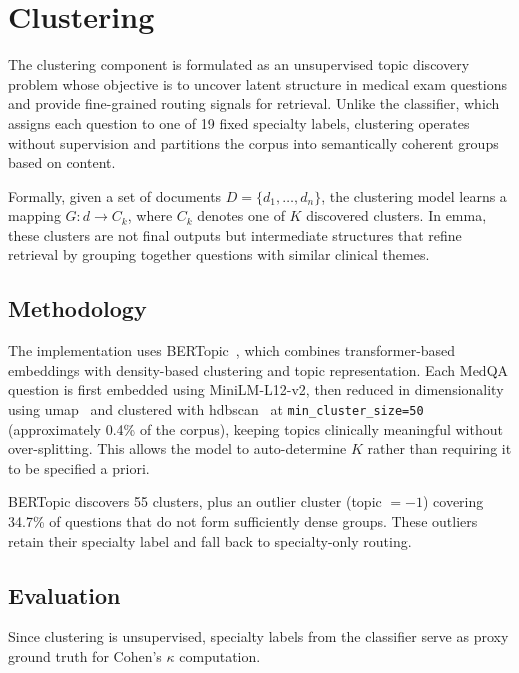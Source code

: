 \section{Clustering}
\label{sec:clustering}

The clustering component is formulated as an unsupervised topic discovery problem whose objective is to uncover latent structure in medical exam questions and provide fine-grained routing signals for retrieval. Unlike the classifier, which assigns each question to one of 19 fixed specialty labels, clustering operates without supervision and partitions the corpus into semantically coherent groups based on content.

Formally, given a set of documents $D = \{d_1,\ldots,d_n\}$, the clustering model learns a mapping $G: d \rightarrow C_k$, where $C_k$ denotes one of $K$ discovered clusters. In \gls{emma}, these clusters are not final outputs but intermediate structures that refine retrieval by grouping together questions with similar clinical themes.

\subsection{Methodology}

The implementation uses BERTopic~\cite{grootendorst_bertopic_2022}, which combines transformer-based embeddings with density-based clustering and topic representation. Each MedQA question is first embedded using MiniLM-L12-v2, then reduced in dimensionality using \gls{umap}~\cite{mcinnes_umap_2020} and clustered with \gls{hdbscan}~\cite{campello_densitybased_2013} at \texttt{min\_cluster\_size=50} (approximately 0.4\% of the corpus), keeping topics clinically meaningful without over-splitting. This allows the model to auto-determine $K$ rather than requiring it to be specified a priori.

BERTopic discovers 55 clusters, plus an outlier cluster (topic $= -1$) covering 34.7\% of questions that do not form sufficiently dense groups. These outliers retain their specialty label and fall back to specialty-only routing.

\subsection{Evaluation}

Since clustering is unsupervised, specialty labels from the classifier serve as proxy ground truth for Cohen's $\kappa$ computation.

